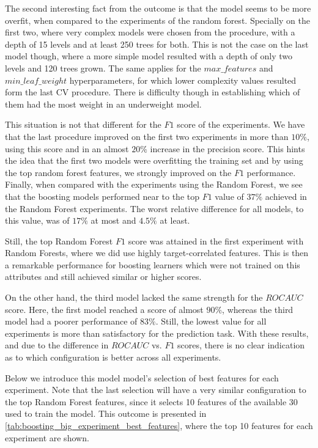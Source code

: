 The second interesting fact from the outcome is that the model seems to be more overfit, when compared to the experiments of the random forest.
Specially on the first two, where very complex models were chosen from the procedure, with a depth of 15 levels and at least 250 trees for both.
This is not the case on the last model though, where a more simple model resulted with a depth of only two levels and 120 trees grown.
The same applies for the $max\_features$ and $min\_leaf\_weight$ hyperparameters, for which lower complexity values resulted form the last CV procedure.
There is difficulty though in establishing which of them had the most weight in an underweight model.

This situation is not that different for the $F1$ score of the experiments.
We have that the last procedure improved on the first two experiments in more than $10\%$, using this score and in an almost $20\%$ increase in the precision score.
This hints the idea that the first two models were overfitting the training set and by using the top random forest features, we strongly improved on the $F1$ performance.
Finally, when compared with the experiments using the Random Forest, we see that the boosting models performed near to the top $F1$ value of $37\%$ achieved in the Random Forest experiments.
The worst relative difference for all models, to this value, was of $17\%$ at most and $4.5\%$ at least.

Still, the top Random Forest $F1$ score was attained in the first experiment with Random Forests, where we did use highly target-correlated features.
This is then a remarkable performance for boosting learners which were not trained on this attributes and still achieved similar or higher scores.


On the other hand, the third model lacked the same strength for the $ROC AUC$ score.
Here, the first model reached a score of almost $90\%$, whereas the third model had a poorer performance of $83\%$.
Still, the lowest value for all experiments is more than satisfactory for the prediction task.
With these results, and due to the difference in $ROC AUC$ vs. $F1$ scores, there is no clear indication as to which configuration is better across all experiments.


Below we introduce this model model's selection of best features for each experiment.
Note that the last selection will have a very similar configuration to the top Random Forest features, since it selects 10 features of the available 30 used to train the model.
This outcome is presented in \cref{tab:boosting_big_experiment_best_features}, where the top 10 features for each experiment are shown.


